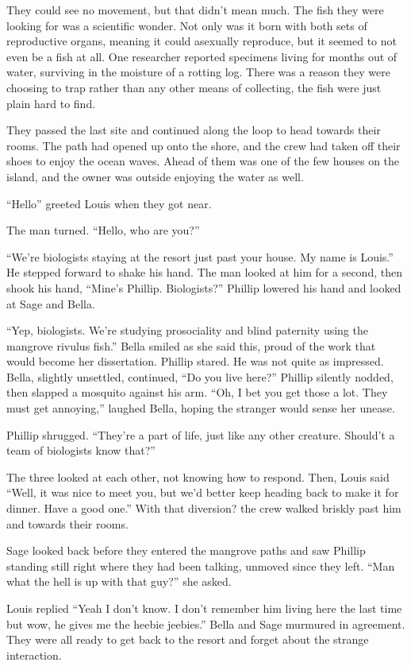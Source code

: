 \documentclass[12pt, fleqn, AofM.tex]{subfiles}
\begin{document}
They could see no movement, but that didn't mean much. The fish they were looking for was a scientific wonder. Not only was it born with both sets of reproductive organs, meaning it could asexually reproduce, but it seemed to not even be a fish at all. One researcher reported specimens living for months out of water, surviving in the moisture of a rotting log. There was a reason they were choosing to trap rather than any other means of collecting, the fish were just plain hard to find. 

They passed the last site and continued along the loop to head towards their rooms. The path had opened up onto the shore, and the crew had taken off their shoes to enjoy the ocean waves. Ahead of them was one of the few houses on the island, and the owner was outside enjoying the water as well. 

“Hello” greeted Louis when they got near.

The man turned. “Hello, who are you?”

“We're biologists staying at the resort just past your house. My name is Louis.” He stepped forward to shake his hand. 
The man looked at him for a second, then shook his hand, “Mine's Phillip. Biologists?” Phillip lowered his hand and looked at Sage and Bella.

“Yep, biologists. We're studying prosociality and blind paternity using the mangrove rivulus fish.” Bella smiled as she said this, proud of the work that would become her dissertation. Phillip stared. He was not quite as impressed. Bella, slightly unsettled, continued, “Do you live here?” Phillip silently nodded, then slapped a mosquito against his arm. “Oh, I bet you get those a lot. They must get annoying,” laughed Bella, hoping the stranger would sense her unease.

Phillip shrugged. “They're a part of life, just like any other creature. Should't a team of biologists know that?”

The three looked at each other, not knowing how to respond. Then, Louis said “Well, it was nice to meet you, but we'd better keep heading back to make it for dinner. Have a good one.” With that diversion? the crew walked briskly past him and towards their rooms. 

Sage looked back before they entered the mangrove paths and saw Phillip standing still right where they had been talking, unmoved since they left. “Man what the hell is up with that guy?” she asked.

Louis replied “Yeah I don't know. I don't remember him living here the last time but wow, he gives me the heebie jeebies.” Bella and Sage murmured in agreement. They were all ready to get back to the resort and forget about the strange interaction. 
  
\end{document}
